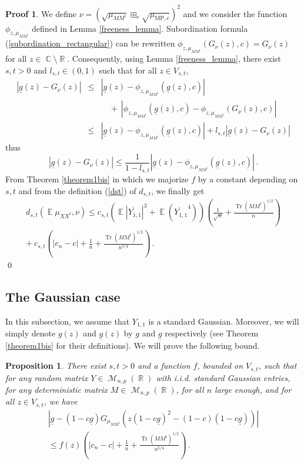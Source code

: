 \documentclass[11pt,a4paper]{article}
\DeclareMathOperator{\E}{\mathbb{E}}
\DeclareMathOperator{\R}{\mathbb{R}}
\DeclareMathOperator{\C}{\mathbb{C}}
\DeclareMathOperator{\MM}{\mathcal{M}}
\DeclareMathOperator{\1}{\mathbf{1}}
\DeclareMathOperator{\Tr}{\mathrm{Tr}}
\newcommand{\mump}{\mu_{\mathrm{MP},c}}
\newcommand{\gbar}{\underline{g}}
\newtheorem{Proposition}{Proposition}[section]
\theoremstyle{definition}
\newtheorem*{Proof}{Proof}
\begin{document}
\begin{Proof}
We define $\nu = \left( \sqrt{\mu_{MM^t}} \boxplus_c \sqrt{\mump} \right)^2$ and we consider the function $\phi_{z,\mu_{MM^t}}$ defined in Lemma \ref{freeness_lemma}. Subordination formula (\ref{subordination_rectangular}) can be rewritten $\phi_{z,\mu_{MM^t}}(G_{\nu}(z),c) = G_{\nu}(z)$ for all $z \in \C \setminus \R$. Consequently, using Lemma \ref{freeness_lemma}, there exist $s,t>0$ and $l_{s,t} \in (0,1)$ such that for all $z \in V_{s,t}$,
\begin{eqnarray*}
\left| \gbar(z) - G_{\nu}(z) \right|
& \le & \left| \gbar(z) - \phi_{z,\mu_{MM^t}}(\gbar(z),c) \right| \\
& & \quad + \ \left| \phi_{z,\mu_{MM^t}}(\gbar(z),c) - \phi_{z,\mu_{MM^t}}(G_{\nu}(z),c) \right| \\
& \le & \left| \gbar(z) - \phi_{z,\mu_{MM^t}}(\gbar(z),c) \right| + l_{s,t} \left| \gbar(z) - G_{\nu}(z) \right|
\end{eqnarray*}
thus
\begin{displaymath}
\left| \gbar(z) - G_{\nu}(z) \right| \le \frac{1}{1-l_{s,t}} \left| \gbar(z) - \phi_{z,\mu_{MM^t}}(\gbar(z),c) \right| \, .
\end{displaymath}
From Theorem \ref{theorem1bis} in which we majorize $f$ by a constant depending on $s,t$ and from the definition (\ref{dst}) of $d_{s,t}$, we finally get
\begin{multline*}
d_{s,t} \left( \E \mu_{XX^t} , \nu \right) \le c_{s,t} \left( \E |\mathring{Y_{1,1}}|^3 + \E(\mathring{Y_{1,1}}^4) \right) \left( \frac{1}{\sqrt{n}} + \frac{\Tr(MM^t)^{1/2}}{n} \right) \\
+ \ c_{s,t} \left( |c_n-c| + \frac1n + \frac{\Tr(MM^t)^{1/2}}{n^{5/4}} \right) \, .
\end{multline*} \qed
\end{Proof}




\subsection{The Gaussian case}

In this subsection, we assume that $Y_{1,1}$ is a standard Gaussian. Moreover, we will simply denote $g(z)$ and $\gbar(z)$ by $g$ and $\gbar$ respectively (see Theorem \ref{theorem1bis} for their definitions). We will prove the following bound.

\begin{Proposition} \label{freeness_Gaussian}
There exist $s,t>0$ and a function $f$, bounded on $V_{s,t}$, such that for any random matrix $Y \in \MM_{n,p}(\R)$ with i.i.d. standard Gaussian entries, for any deterministic matrix $M \in \MM_{n,p}(\R)$, for all $n$ large enough, and for all $z \in V_{s,t}$, we have
\begin{multline*}
\left| \gbar - (1-c\gbar) G_{\mu_{MM^t}} (z(1-c\gbar)^2 - (1-c)(1-c\gbar)) \right| \\
\le f(z) \left( |c_n-c| + \frac1n + \frac{\Tr(MM^t)^{1/2}}{n^{5/4}} \right) \, .
\end{multline*}
\end{Proposition}
\end{document}
